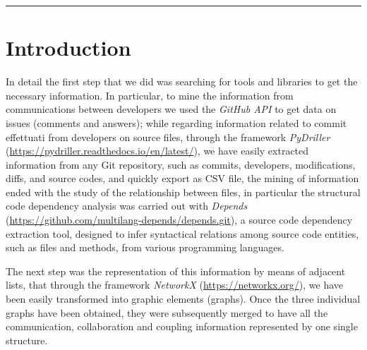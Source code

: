 \documentclass[sigconf]{acmart}
\begin{document}


\begin{teaserfigure}
\rule{\linewidth}{1mm}
\end{teaserfigure}

\maketitle

\section{Introduction}
In detail the first step that we did was searching for tools and libraries to get the necessary information. In particular, to mine the information from communications between developers we used the {\itshape GitHub API }to get data on issues (comments and answers); while regarding information related to commit effettuati from developers on source files, through the framework {\itshape PyDriller} (\url{https://pydriller.readthedocs.io/en/latest/}), we have easily extracted information from any Git repository, such as commits, developers, modifications, diffs, and source codes, and quickly export as CSV file, the mining of information ended with the study of the relationship between files, in particular the structural code dependency analysis was carried out with {\itshape Depends} (\url{https://github.com/multilang-depends/depends.git}), a source code dependency extraction tool, designed to infer syntactical relations among source code entities, such as files and methods, from various programming languages.

The next step was the representation of this information by means of adjacent lists, that through the framework {\itshape NetworkX} (\url{https://networkx.org/}), we have been easily transformed into graphic elements (graphs). Once the three individual graphs have been obtained, they were subsequently merged to have all the communication, collaboration and coupling information represented by one single structure. 
\end{document}
